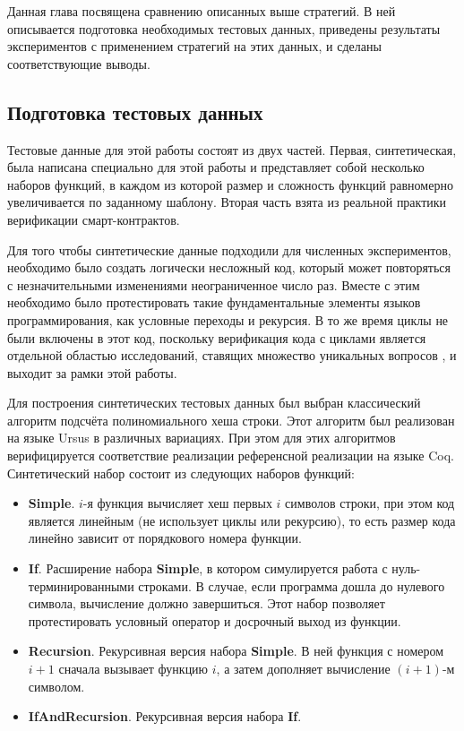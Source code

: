 \documentclass[../thesis.tex]{subfiles}
\begin{document}
\label{sec:3}

Данная глава посвящена сравнению описанных выше стратегий. В ней описывается подготовка необходимых тестовых данных, приведены результаты экспериментов с применением стратегий на этих данных, и сделаны соответствующие выводы.

\subsection{Подготовка тестовых данных}\label{dataset}

Тестовые данные для этой работы состоят из двух частей. Первая, синтетическая, была написана специально для этой работы и представляет собой несколько наборов функций, в каждом из которой размер и сложность функций равномерно увеличивается по заданному шаблону. Вторая часть взята из реальной практики верификации смарт-контрактов.

Для того чтобы синтетические данные подходили для численных экспериментов, необходимо было создать логически несложный код, который может повторяться с незначительными изменениями неограниченное число раз. Вместе с этим необходимо было протестировать такие фундаментальные элементы языков программирования, как условные переходы и рекурсия. В то же время циклы не были включены в этот код, поскольку верификация кода с циклами является отдельной областью исследований, ставящих множество уникальных вопросов \cite{loops_are_hard}, и выходит за рамки этой работы.

Для построения синтетических тестовых данных был выбран классический алгоритм подсчёта полиномиального хеша строки. Этот алгоритм был реализован на языке Ursus в различных вариациях. При этом для этих алгоритмов верифицируется соответствие реализации референсной реализации на языке Coq. Синтетический набор состоит из следующих наборов функций:

\begin{itemize}
    \item \textbf{Simple}. $i$-я функция вычисляет хеш первых $i$ символов строки, при этом код является линейным (не использует циклы или рекурсию), то есть размер кода линейно зависит от порядкового номера функции.
    \item \textbf{If}. Расширение набора \textbf{Simple}, в котором симулируется работа с нуль-\\ терминированными строками. В случае, если программа дошла до нулевого символа, вычисление должно завершиться. Этот набор позволяет протестировать условный оператор и досрочный выход из функции.
    \item \textbf{Recursion}. Рекурсивная версия набора \textbf{Simple}. В ней функция с номером $i+1$ сначала вызывает функцию $i$, а затем дополняет вычисление $(i+1)$-м символом.
    \item \textbf{IfAndRecursion}. Рекурсивная версия набора \textbf{If}.
\end{itemize}
\end{document}
